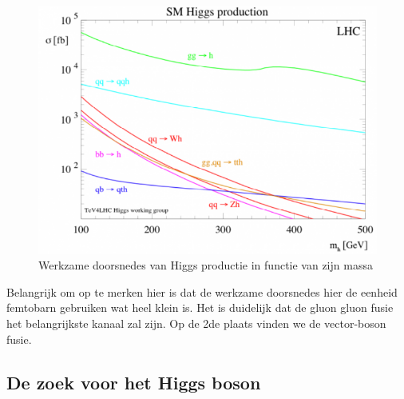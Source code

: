 \documentclass[../main.tex]{subfiles}
\begin{document}
\begin{figure}[h]
    \centering
    \includegraphics[width=0.6\linewidth]{higgs_boson/h_prod_lhc.png}
    \caption{Werkzame doorsnedes van Higgs productie in functie van zijn massa}%
    \label{fig:higgs_boson/h_prod_lhc}
\end{figure}

Belangrijk om op te merken hier is dat de werkzame doorsnedes hier de eenheid femtobarn gebruiken wat heel klein is. Het is duidelijk dat de gluon gluon fusie het belangrijkste kanaal zal zijn. Op de 2de plaats vinden we de vector-boson fusie.

\subsection{De zoek voor het Higgs boson}%
\label{sub:de_zoek_voor_het_higgs_boson}
\end{document}
